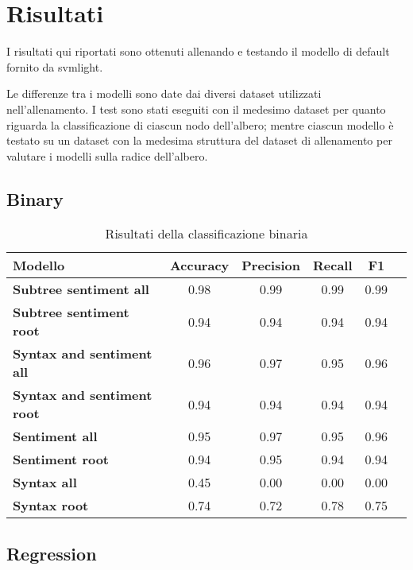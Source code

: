 \section{Risultati}

I risultati qui riportati sono ottenuti allenando e testando il modello di
default fornito da svmlight.

Le differenze tra i modelli sono date dai diversi dataset utilizzati
nell'allenamento. I test sono stati eseguiti con il medesimo dataset per quanto
riguarda la classificazione di ciascun nodo dell'albero; mentre ciascun modello 
è testato su un dataset con la medesima struttura del dataset di allenamento per 
valutare i modelli sulla radice dell'albero.

\subsection{Binary}

\begin{table}[H]
    \centering
    \begin{tabular}{|l|c|c|c|c|c|}
    \hline
    \textbf{Modello} & \textbf{Accuracy} & \textbf{Precision} & \textbf{Recall} & \textbf{F1} \\
    \hline
    \textbf{Subtree sentiment all} & 0.98 & 0.99 & 0.99 & 0.99 \\
    \textbf{Subtree sentiment root} & 0.94 & 0.94 & 0.94 & 0.94 \\
    \hline

    \textbf{Syntax and sentiment all} & 0.96 & 0.97 & 0.95 & 0.96 \\
    \textbf{Syntax and sentiment root} & 0.94 & 0.94 & 0.94 & 0.94 \\
    \hline

    \textbf{Sentiment all} & 0.95 & 0.97 & 0.95 & 0.96 \\
    \textbf{Sentiment root} & 0.94 & 0.95 & 0.94 & 0.94 \\
    \hline

    \textbf{Syntax all} & 0.45 & 0.00 & 0.00 & 0.00 \\
    \textbf{Syntax root} & 0.74 & 0.72 & 0.78 & 0.75 \\
    \hline
    \end{tabular}
    \caption{Risultati della classificazione binaria}
\end{table}

\subsection{Regression}

